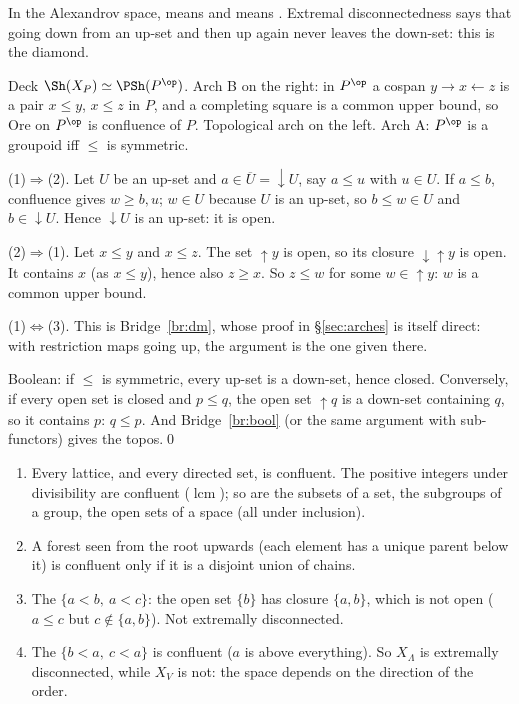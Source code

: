 \inwords{} In the Alexandrov space,  means  and  means . Extremal disconnectedness says that going down from an up-set and then up again never leaves the down-set: this is the diamond.

\gen{} Deck $\Sh(X_P)\simeq\PSh(P^{\op})$. Arch B on the right: in $P^{\op}$ a cospan $y\to x\leftarrow z$ is a pair $x\le y$, $x\le z$ in $P$, and a completing square is a common upper bound, so Ore on $P^{\op}$ is confluence of $P$. Topological arch on the left. Arch A: $P^{\op}$ is a groupoid iff $\le$ is symmetric.

\direct{} (1)$\Rightarrow$(2). Let $U$ be an up-set and $a\in\overline U = \downarrow U$, say $a\le u$ with $u\in U$. If $a\le b$, confluence gives $w\ge b,u$; $w\in U$ because $U$ is an up-set, so $b\le w\in U$ and $b\in\downarrow U$. Hence $\downarrow U$ is an up-set: it is open.

(2)$\Rightarrow$(1). Let $x\le y$ and $x\le z$. The set $\uparrow y$ is open, so its closure $\downarrow\uparrow y$ is open. It contains $x$ (as $x\le y$), hence also $z\ge x$. So $z\le w$ for some $w\in\uparrow y$: $w$ is a common upper bound.

(1)$\Leftrightarrow$(3). This is Bridge~\ref{br:dm}, whose proof in \S\ref{sec:arches} is itself direct: with restriction maps going up, the argument is the one given there.

Boolean: if $\le$ is symmetric, every up-set is a down-set, hence closed. Conversely, if every open set is closed and $p\le q$, the open set $\uparrow q$ is a down-set containing $q$, so it contains $p$: $q\le p$. And Bridge~\ref{br:bool} (or the same argument with sub-functors) gives the topos.\qed

\begin{example}\label{ex:confluentlist}
\begin{enumerate}
\item Every lattice, and every directed set, is confluent. The positive integers under divisibility are confluent ($\operatorname{lcm}$); so are the subsets of a set, the subgroups of a group, the open sets of a space (all under inclusion).
\item A forest seen from the root upwards (each element has a unique parent below it) is confluent only if it is a disjoint union of chains.
\item The  $\{a<b,\ a<c\}$: the open set $\{b\}$ has closure $\{a,b\}$, which is not open ($a\le c$ but $c\notin\{a,b\}$). Not extremally disconnected.
\item The \q{$\Lambda$} $\{b<a,\ c<a\}$ is confluent ($a$ is above everything). So $X_\Lambda$ is extremally disconnected, while $X_V$ is not: the space depends on the direction of the order.
\end{enumerate}
\end{example}

